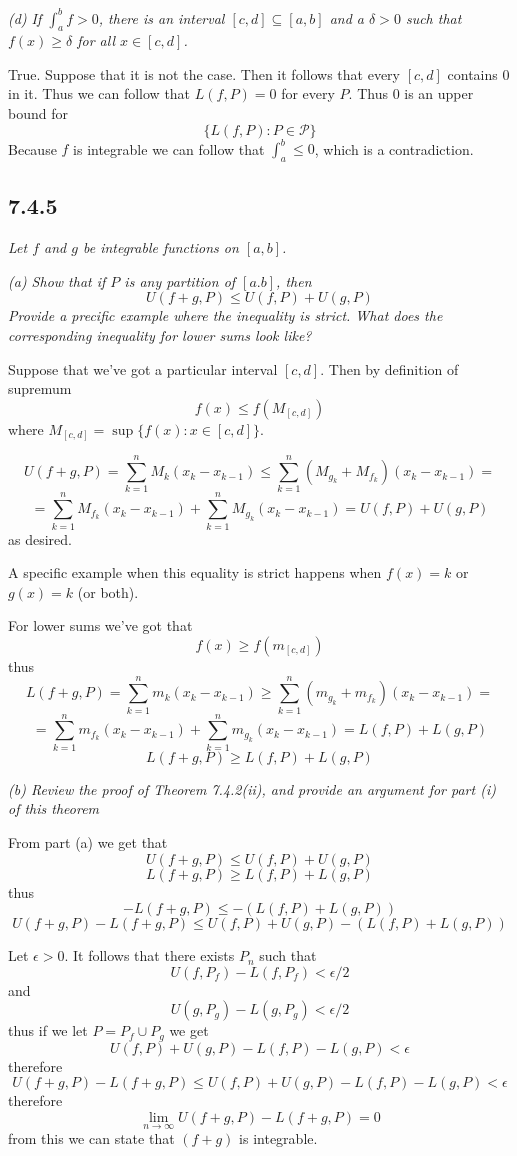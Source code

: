 \documentclass[11pt,oneside,titlepage]{book}
\begin{document}
\textit{(d) If $\int_a^b f > 0$, there is an interval
  $[c, d] \subseteq [a, b]$ and a $\delta > 0$ such that $f(x) \geq \delta$
  for all $x \in [c, d]$. }

True. Suppose that it is not the case. Then it follows that every
$[c, d]$ contains $0$ in it. Thus we can follow that $L(f, P) = 0$ for every
$P$. Thus $0$ is an upper bound for
$$\{L(f, P): P \in \mathcal{P}\}$$
Because $f$ is integrable we can follow that $\int_a^b \leq 0$, which is a
contradiction.

\subsection*{7.4.5}
\textit{Let $f$ and $g$ be integrable functions on $[a, b]$.}

\textit{(a) Show that if $P$ is any partition of $[a. b]$, then}
$$U(f + g, P) \leq U(f, P) + U(g, P)$$
\textit{Provide a precific example where the inequality is strict. What
does the corresponding inequality for lower sums look like?}

Suppose that we've got a particular interval $[c, d]$. Then by definition
of supremum
$$f(x) \leq f(M_{[c, d]})$$
where $M_{[c, d]} = \sup\{f(x): x \in [c, d] \}$.

$$U(f + g, P) = \sum_{k = 1}^n{M_k(x_k - x_{k -  1})} \leq
\sum_{k = 1}^n{(M_{g_k} + M_{f_k})(x_k - x_{k -  1})} =
$$
$$ =
\sum_{k = 1}^n{M_{f_k}(x_k - x_{k -  1})} +
\sum_{k = 1}^n{M_{g_k}(x_k - x_{k -  1})} =
U(f, P)  + U(g, P)$$
as desired.

A specific example when this equality is strict happens when $f(x) = k$
or $g(x) = k$ (or both).

For lower sums we've got that
$$f(x) \geq f(m_{[c, d]})$$
thus
$$L(f + g, P) = \sum_{k = 1}^n{m_k(x_k - x_{k -  1})} \geq
\sum_{k = 1}^n{(m_{g_k} + m_{f_k})(x_k - x_{k -  1})} =
$$
$$ =
\sum_{k = 1}^n{m_{f_k}(x_k - x_{k -  1})} +
\sum_{k = 1}^n{m_{g_k}(x_k - x_{k -  1})} =
L(f, P)  + L(g, P)$$
$$L(f + g, P) \geq L(f, P)  + L(g, P)$$

\textit{(b) Review the proof of Theorem 7.4.2(ii), and provide an argument for
  part (i) of this theorem}

From part (a) we get that
$$U(f + g, P) \leq U(f, P)  + U(g, P)$$
$$L(f + g, P) \geq L(f, P)  + L(g, P)$$
thus
$$- L(f + g, P) \leq - (L(f, P)  + L(g, P))$$
$$U(f + g, P) - L(f + g, P) \leq U(f, P)  + U(g, P) - (L(f, P)  + L(g, P))$$

Let $\epsilon > 0$. It follows that there exists $P_n$ such that 
$$U(f, P_f) - L(f, P_f) < \epsilon/2$$
and
$$U(g, P_g) - L(g, P_g) < \epsilon/2$$
thus if we let $P = P_f \cup P_g$ we get 
$$U(f, P)  + U(g, P) - L(f, P) - L(g, P) < \epsilon$$
therefore
$$U(f + g, P) - L(f + g, P) \leq  U(f, P)  + U(g, P) - L(f, P) - L(g, P) < \epsilon$$
therefore
$$\lim_{n \to \infty}{U(f + g, P) - L(f + g, P)}  = 0$$
from this we can state that $(f + g)$ is integrable.
\end{document}

